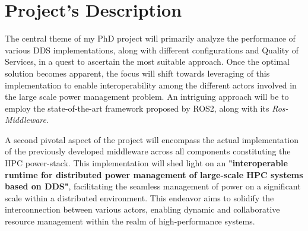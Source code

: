 \section{Project's Description} \label{SEC:pd}


The central theme of my PhD project will primarily analyze the performance of various DDS implementations, along with different configurations and Quality of Services, in a quest to ascertain the most suitable approach. Once the optimal solution becomes apparent, the focus will shift towards leveraging of this implementation to enable interoperability among the different actors involved in the large scale power management problem. An intriguing approach will be to employ the state-of-the-art framework proposed by ROS2, along with its \emph{Ros-Middleware}. 

A second pivotal aspect of the project will encompass the actual implementation of the previously developed middleware across all components constituting the HPC power-stack. This implementation will shed light on an \textbf{"interoperable runtime for distributed power management of large-scale HPC systems based on DDS"}, facilitating the seamless management of power on a significant scale within a distributed environment. This endeavor aims to solidify the interconnection between various actors, enabling dynamic and collaborative resource management within the realm of high-performance systems.


